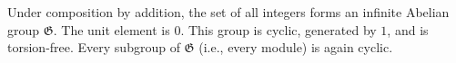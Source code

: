Under composition by addition, the set of all integers forms an infinite Abelian group $\mathfrak{G}$. The unit element is $0$. This group is cyclic, generated by $1$, and is torsion-free. Every subgroup of $\mathfrak{G}$ (i.e., every module) is again cyclic.
